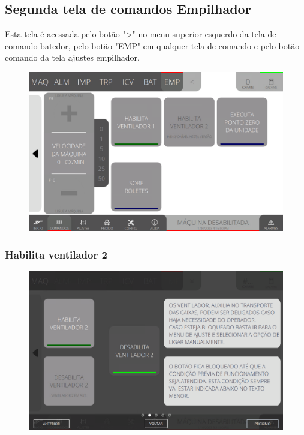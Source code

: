 \newpage
\thispagestyle{fancy}
\vspace*{40 pt}
\subsection{Segunda tela de comandos Empilhador} \label{sec:telaComandosEmpilhador2}
Esta tela é acessada pelo botão "\textgreater" no menu superior esquerdo da tela de comando batedor, pelo botão "EMP" em qualquer tela de comando e pelo botão comando da tela ajustes empilhador.
\vspace*{\fill}
\begin{figure}[h]
    \centering
    \includegraphics[width=480 px,height=300 px]{src/imagesICV/08-stacker/commands/Tela-Principal-2.png}
\end{figure}
\vspace*{\fill}


\newpage
\thispagestyle{fancy}
\vspace*{40 pt}
\subsubsection{\small{Habilita ventilador 2}} \label{sec:telaComandosEmpilhador2HabilitaVentilador2}
\vspace*{\fill}
\begin{figure}[h]
    \centering
    \includegraphics[width=576 px,height=360 px]{src/imagesICV/08-stacker/commands/e-2.png}
\end{figure}
\vspace*{\fill}

